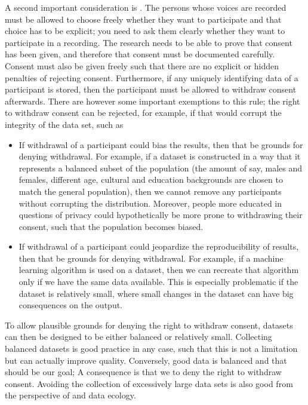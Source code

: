 \documentclass[letterpaper,10pt,english]{jupyterBook}
\begin{document}
\sphinxAtStartPar
A second important consideration is . The persons whose voices
are recorded must be allowed to choose freely whether they want to
participate and that choice has to be explicit; you need to ask them
clearly whether they want to participate in a recording. The research
needs to be able to prove that consent has been given, and therefore
that consent must be documented carefully. Consent must also be given
freely such that there are no explicit or hidden penalties of rejecting
consent. Furthermore, if any uniquely identifying data of a participant
is stored, then the participant must be allowed to withdraw consent
afterwards. There are however some important exemptions to this rule;
the right to withdraw consent can be rejected, for example, if that
would corrupt the integrity of the data set, such as
\begin{itemize}
\item {} 
\sphinxAtStartPar
If withdrawal of a participant could bias the results, then that
 be grounds for denying withdrawal. For example, if a dataset
is constructed in a way that it represents a balanced subset of the
population (the amount of say, males and females, different age,
cultural and education backgrounds are chosen to match the general
population), then we cannot remove any participants without
corrupting the distribution. Moreover, people more educated in
questions of privacy could hypothetically be more prone to
withdrawing their consent, such that the population becomes biased.

\item {} 
\sphinxAtStartPar
If withdrawal of a participant could jeopardize the reproducibility
of results, then that  be grounds for denying withdrawal. For
example, if a machine learning algorithm is used on a dataset, then
we can recreate that algorithm only if we have  the same
data available. This is especially problematic if the dataset is
relatively small, where small changes in the dataset can have big
consequences on the output.

\end{itemize}

\sphinxAtStartPar
To allow plausible grounds for denying the right to withdraw consent,
datasets can then be designed to be either balanced or relatively small.
Collecting balanced datasets is good practice in any case, such that
this is not a limitation but can actually improve quality. Conversely,
good data is balanced and that should be our goal; A consequence is that
we  to deny the right to withdraw consent. Avoiding the
collection of excessively large data sets is also good from the
perspective of  and data ecology.
\end{document}
